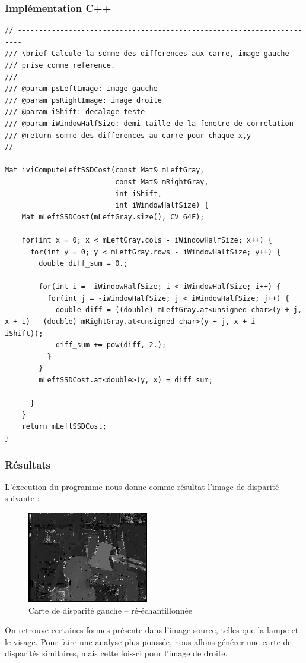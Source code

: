 \documentclass[a4paper]{article}
\begin{document}
\subsubsection{Implémentation C++}
\begin{lstlisting}
// -----------------------------------------------------------------------
/// \brief Calcule la somme des differences aux carre, image gauche
/// prise comme reference.
///
/// @param psLeftImage: image gauche
/// @param psRightImage: image droite
/// @param iShift: decalage teste
/// @param iWindowHalfSize: demi-taille de la fenetre de correlation
/// @return somme des differences au carre pour chaque x,y
// -----------------------------------------------------------------------
Mat iviComputeLeftSSDCost(const Mat& mLeftGray,
                          const Mat& mRightGray,
                          int iShift,
                          int iWindowHalfSize) {
    Mat mLeftSSDCost(mLeftGray.size(), CV_64F);

    for(int x = 0; x < mLeftGray.cols - iWindowHalfSize; x++) {
      for(int y = 0; y < mLeftGray.rows - iWindowHalfSize; y++) {
        double diff_sum = 0.;

        for(int i = -iWindowHalfSize; i < iWindowHalfSize; i++) {
          for(int j = -iWindowHalfSize; j < iWindowHalfSize; j++) {
            double diff = ((double) mLeftGray.at<unsigned char>(y + j, x + i) - (double) mRightGray.at<unsigned char>(y + j, x + i - iShift));
            diff_sum += pow(diff, 2.);
          }
        }
        mLeftSSDCost.at<double>(y, x) = diff_sum;

      }
    }
    return mLeftSSDCost;
}
\end{lstlisting}

\subsubsection{Résultats}

L'éxecution du programme nous donne comme résultat l'image de disparité suivante :
\begin{figure}[h]
\begin{center}
	\includegraphics[width=200px]{left-disparity_resampled.png}
\end{center}
\caption{Carte de disparité gauche -- ré-échantillonnée}
\end{figure}
On retrouve certaines formes présente dans l'image source, telles que la lampe et le visage. Pour faire une analyse plus poussée, nous allons générer une carte de disparités similaires, mais cette fois-ci pour l'image de droite.
\end{document}
